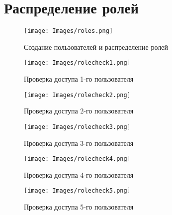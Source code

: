 \section{Распределение ролей}

\begin{figure}[h]
\centering
\texttt{[image: Images/roles.png]}
\caption{Создание пользователей и распределение ролей}
\end{figure}

\begin{figure}[h]
\centering
\texttt{[image: Images/rolecheck1.png]}
\caption{Проверка доступа 1-го пользователя}
\end{figure}

\begin{figure}[h]
\centering
\texttt{[image: Images/rolecheck2.png]}
\caption{Проверка доступа 2-го пользователя}
\end{figure}

\begin{figure}[h]
\centering
\texttt{[image: Images/rolecheck3.png]}
\caption{Проверка доступа 3-го пользователя}
\end{figure}

\begin{figure}[h]
\centering
\texttt{[image: Images/rolecheck4.png]}
\caption{Проверка доступа 4-го пользователя}
\end{figure}

\begin{figure}[h]
\centering
\texttt{[image: Images/rolecheck5.png]}
\caption{Проверка доступа 5-го пользователя}
\end{figure}